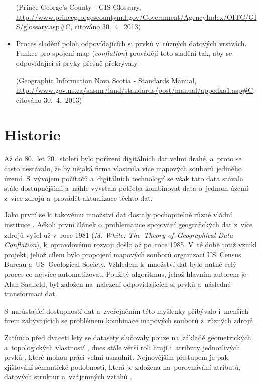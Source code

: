 \begin{itemize}
    (Prince George's County - GIS Glossary,
    \url{http://www.princegeorgescountymd.gov/Government/AgencyIndex/OITC/GIS/glossary.asp#C},
    citováno 30.~4.~2013)

  \item Proces sladění poloh odpovídajících si prvků v~různých datových 
    vrstvách. Funkce pro spojení map (\textit{conflation}) provádějí toto 
    sladění tak, aby se odpovídající si prvky přesně překrývaly. 
    
    (Geographic Information Nova Scotia - Standards Manual,
    \url{http://www.gov.ns.ca/snsmr/land/standards/post/manual/appedxa1.asp#C},
     citováno 30.~4.~2013)

\end{itemize}

\section{Historie}
\label{historie}

Až do 80.~let 20.~století bylo pořízení digitálních dat velmi drahé, a~proto 
se často nestávalo, že by nějaká firma vlastnila více mapových souborů jediného 
území. S~vývojem počítačů a~digitálních technologií se však tato data stávala 
stále do\-stupnějšími a~náhle vyvstala potřeba kombinovat data o~jednom území 
z~více zdrojů a~provádět aktualizace těchto dat. 

Jako první se k~takovému množství dat dostaly pochopitelně různé vládní 
instituce \cite{saalfeld}. Ačkoli první článek o~problematice spojování geografických dat 
z~více zdrojů vyšel už v~roce 1981 (\textit{M. White: The~Theory of~Geographical
Data Conflation}), k~opravdovému rozvoji došlo až po~roce 1985. V~té době 
totiž vznikl projekt, jehož cílem bylo propojení mapových souborů organizací
US~Census Bureau a~US~Geological Society. Vzhledem k~množství dat bylo nutné
celý proces co nejvíce auto\-matizovat. Použitý algoritmus, jehož hlavním autorem
je Alan Saalfeld, byl založen na~nalezení odpovídajících si prvků a~následné 
transformaci dat. 

S~narůstající dostupností dat a~zveřejněním této myšlenky přibývalo i~menších 
firem zabývajících se problémem kombinace mapových souborů z~různých zdrojů.

Zatímco před dvaceti lety se datasety slučovaly pouze na~základě geometric\-kých 
a~topologických vlastností \cite{saalfeld}, dnes stále větší roli hrají i~atributy 
jednotlivých prvků \cite{cobb}, které mohou práci velmi usnadnit. Nejnovějším 
přístupem je pak zjišťování sémantické podobnosti, která je založena na~porovnávání 
atributů, datových struktur a~vzájemných vztahů \cite{semantic}.


